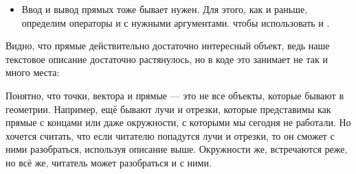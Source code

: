 \begin{itemize}
    Хочется разделять эти два случая, поэтому проверим различаются ли все коэффициенты в одинаковое количество раз (если да, то это уравнения одной прямой). Понятно, что это означает необходимость проверить три равенства:
    \[\begin{multisys}
        \begin{system}
            \frac{a_1}{a_2} = \frac{b_1}{b_2} \\
            \frac{b_1}{b_2} = \frac{c_1}{c_2} \\
            \frac{c_1}{c_2} = \frac{a_1}{a_2}
        \end{system}
        \iff
        \begin{system}
            a_1 b_2 = a_2 b_1 \\
            b_1 c_2 = b_2 c_1 \\
            a_2 c_1 = a_1 c_2
        \end{system}
        \iff
        \begin{system}
            a_1 b_2 - a_2 b_1 = 0 \\
            b_1 c_2 - b_2 c_1 = 0 \\
            a_2 c_1 - a_1 c_2 = 0
        \end{system}
    \end{multisys}\]
    Интересно, что первое из этих равенств мы уже проверили, а второе и третье выражения используются в формулах для координаты точки пересечения прямых.
    
    Таким образом, мы умеем разделять случаи взаимного расположения прямых и определять точку их пересечения, а в коде для пересечения удобно использовать оператор \lcpp{^}.
    
    \item Ввод и вывод прямых тоже бывает нужен. Для этого, как и раньше, определим операторы \lcpp{>>} и \lcpp{<<} с нужными аргументами. чтобы использовать  и .
\end{itemize}

Видно, что прямые действительно достаточно интересный объект, ведь наше текстовое описание достаточно растянулось, но в коде это занимает не так и много места:

\nocode


Понятно, что точки, вектора и прямые — это не все объекты, которые бывают в геометрии. Например, ещё бывают лучи и отрезки, которые представимы как прямые с концами или даже окружности, с которыми мы сегодня не работали. Но хочется считать, что если читателю попадутся лучи и отрезки, то он сможет с ними разобраться, используя описание выше. Окружности же, встречаются реже, но всё же, читатель может разобраться и с ними.

